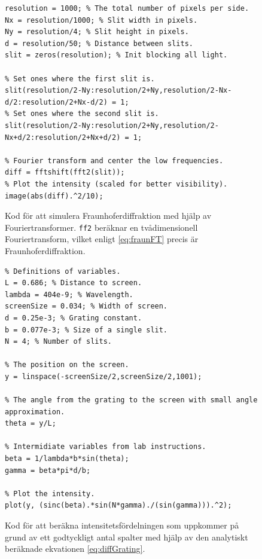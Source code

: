 \documentclass[a4paper]{article}
\begin{document}
  \begin{figure}[ht]
  \centering
  \begin{lstlisting}
resolution = 1000; % The total number of pixels per side.
Nx = resolution/1000; % Slit width in pixels.
Ny = resolution/4; % Slit height in pixels.
d = resolution/50; % Distance between slits.
slit = zeros(resolution); % Init blocking all light.

% Set ones where the first slit is.
slit(resolution/2-Ny:resolution/2+Ny,resolution/2-Nx-d/2:resolution/2+Nx-d/2) = 1;
% Set ones where the second slit is.
slit(resolution/2-Ny:resolution/2+Ny,resolution/2-Nx+d/2:resolution/2+Nx+d/2) = 1;

% Fourier transform and center the low frequencies.
diff = fftshift(fft2(slit));
% Plot the intensity (scaled for better visibility).
image(abs(diff).^2/10);
  \end{lstlisting}
  \caption{Kod för att simulera Fraunhoferdiffraktion med hjälp av Fouriertransformer. \lstinline{ff2} beräknar en tvådimensionell Fouriertransform, vilket enligt \eqref{eq:fraunFT} precis är Fraunhoferdiffraktion.}
  \label{fig:fftFraunCode}
  \end{figure}

  \begin{figure}[ht]
  \centering
  \begin{lstlisting}
% Definitions of variables.
L = 0.686; % Distance to screen.
lambda = 404e-9; % Wavelength.
screenSize = 0.034; % Width of screen.
d = 0.25e-3; % Grating constant.
b = 0.077e-3; % Size of a single slit.
N = 4; % Number of slits.

% The position on the screen.
y = linspace(-screenSize/2,screenSize/2,1001);

% The angle from the grating to the screen with small angle approximation.
theta = y/L;

% Intermidiate variables from lab instructions.
beta = 1/lambda*b*sin(theta);
gamma = beta*pi*d/b;

% Plot the intensity.
plot(y, (sinc(beta).*sin(N*gamma)./(sin(gamma))).^2);
  \end{lstlisting}
  \caption{Kod för att beräkna intensitetsfördelningen som uppkommer på grund av ett godtyckligt antal spalter med hjälp av den analytiskt beräknade ekvationen \eqref{eq:diffGrating}.}
  \label{fig:analyticalGratingCode}
  \end{figure}
\end{document}
